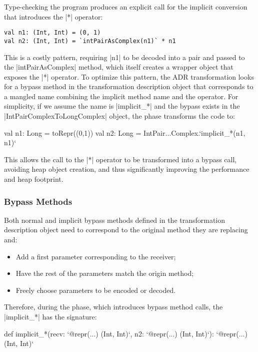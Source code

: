 Type-checking the program produces an explicit call for the implicit conversion that introduces the |*| operator:


\begin{lstlisting}
val n1: (Int, Int) = (0, 1)
val n2: (Int, Int) = `intPairAsComplex(n1)` * n1
\end{lstlisting}

This is a costly pattern, requiring |n1| to be decoded into a pair and passed to the |intPairAsComplex| method, which itself creates a wrapper object that exposes the |*| operator. To optimize this pattern, the ADR transformation looks for a bypass method in the transformation description object that corresponds to a mangled name combining the implicit method name and the operator. For simplicity, if we assume the name is |implicit_*| and the bypass exists in the |IntPairComplexToLongComplex| object, the \coerce{} phase transforms the code to:

\begin{lstlisting-nobreak}
val n1: Long = toRepr((0,1))
val n2: Long = IntPair...Complex.`implicit_*(n1, n1)`
\end{lstlisting-nobreak}

This allows the call to the |*| operator to be transformed into a bypass call, avoiding heap object creation, and thus significantly improving the performance and heap footprint.


\subsubsection*{Bypass Methods}

Both normal and implicit bypass methods defined in the transformation description object need to correspond to the original method they are replacing and:

\begin{itemize}
\item Add a first parameter corresponding to the receiver;
\item Have the rest of the parameters match the origin method;
\item Freely choose parameters to be encoded or decoded.
\end{itemize}

Therefore, during the \coerce{} phase, which introduces bypass method calls, the |implicit_*| has the signature:

\begin{lstlisting-nobreak}
def implicit_*(recv: `@repr(...) (Int, Int)`,  n2: `@repr(...) (Int, Int)`): `@repr(...) (Int, Int)`
\end{lstlisting-nobreak}

